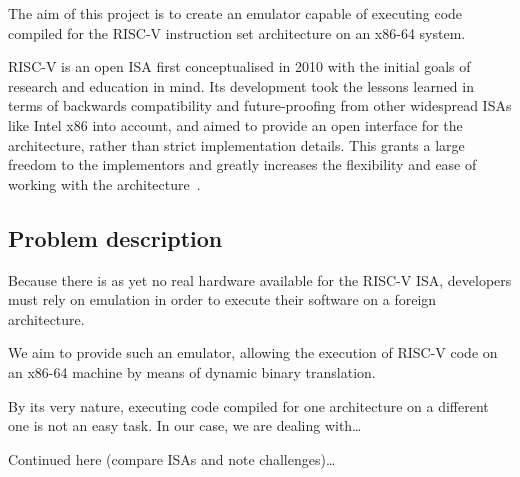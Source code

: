 The aim of this project is to create an emulator capable of executing code compiled for the RISC-V instruction set architecture on an x86-64 system.

RISC-V is an open ISA first conceptualised in 2010 with the initial goals of research and education in mind.
Its development took the lessons learned in terms of backwards compatibility and future-proofing from other widespread ISAs like Intel x86 into account, and aimed to provide an open interface for the architecture, rather than strict implementation details.
This grants a large freedom to the implementors and greatly increases the flexibility and ease of working with the architecture~\cite[S. 1f]{riscvspec}.

\subsection{Problem description}
Because there is as yet no real hardware available for the RISC-V ISA, developers must rely on emulation in order to execute their software on a foreign architecture.

We aim to provide such an emulator, allowing the execution of RISC-V code on an x86-64 machine by means of dynamic binary translation.

By its very nature, executing code compiled for one architecture on a different one is not an easy task.
In our case, we are dealing with\ldots

Continued here (compare ISAs and note challenges)\ldots